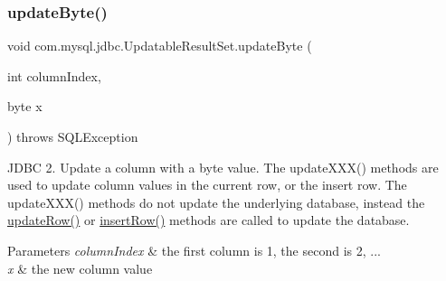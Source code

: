 \subsubsection{\texorpdfstring{update\+Byte()}{updateByte()}\hspace{0.1cm}{\footnotesize\ttfamily [1/2]}}
{\footnotesize\ttfamily void com.\+mysql.\+jdbc.\+Updatable\+Result\+Set.\+update\+Byte (\begin{DoxyParamCaption}\item[{int}]{column\+Index,  }\item[{byte}]{x }\end{DoxyParamCaption}) throws S\+Q\+L\+Exception}

J\+D\+BC 2. Update a column with a byte value. The update\+X\+X\+X() methods are used to update column values in the current row, or the insert row. The update\+X\+X\+X() methods do not update the underlying database, instead the \mbox{\hyperlink{classcom_1_1mysql_1_1jdbc_1_1_updatable_result_set_a919969ba4b3c7cbc7b18605e9f31a746}{update\+Row()}} or \mbox{\hyperlink{classcom_1_1mysql_1_1jdbc_1_1_updatable_result_set_aef041f8d9d0778083716fc26652648fa}{insert\+Row()}} methods are called to update the database.


\begin{DoxyParams}{Parameters}
{\em column\+Index} & the first column is 1, the second is 2, ... \\
\hline
{\em x} & the new column value\\
\hline
\end{DoxyParams}

